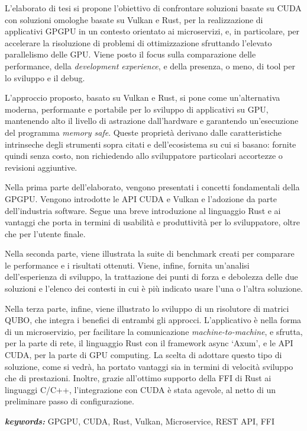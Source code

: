 
L'elaborato di tesi si propone l'obiettivo di confrontare soluzioni basate su \gls{CUDA} con soluzioni omologhe basate su Vulkan e Rust, per la realizzazione di applicativi \gls{GPGPU} in un contesto orientato ai microservizi, e, in particolare, per accelerare la risoluzione di problemi di ottimizzazione sfruttando l'elevato parallelismo delle GPU. Viene posto il focus sulla comparazione delle performance, della \textit{development experience}, e della presenza, o meno, di tool per lo sviluppo e il debug.

L'approccio proposto, basato su Vulkan e Rust, si pone come un'alternativa moderna, performante e portabile per lo sviluppo di applicativi su GPU, mantenendo alto il livello di astrazione dall'hardware e garantendo un'esecuzione del programma \textit{memory safe}. Queste proprietà derivano dalle caratteristiche intrinseche degli strumenti sopra citati e dell'ecosistema su cui si basano: fornite quindi senza costo, non richiedendo allo sviluppatore particolari accortezze o revisioni aggiuntive.

Nella prima parte dell'elaborato, vengono presentati i concetti fondamentali della \gls{GPGPU}. Vengono introdotte le \gls{API} \gls{CUDA} e Vulkan e l'adozione da parte dell'industria software. Segue una breve introduzione al linguaggio Rust e ai vantaggi che porta in termini di usabilità e produttività per lo sviluppatore, oltre che per l'utente finale.

Nella seconda parte, viene illustrata la suite di benchmark creati per comparare le performance e i risultati ottenuti. Viene, infine, fornita un'analisi dell'esperienza di sviluppo, la trattazione dei punti di forza e debolezza delle due soluzioni e l'elenco dei contesti in cui è più indicato usare l'una o l'altra soluzione.

Nella terza parte, infine, viene illustrato lo sviluppo di un risolutore di matrici QUBO, che integra i benefici di entrambi gli approcci. L'applicativo è nella forma di un microservizio, per facilitare la comunicazione \textit{machine-to-machine}, e sfrutta, per la parte di rete, il linguaggio Rust con il framework async `Axum', e le \gls{API} \gls{CUDA}, per la parte di \gls{GPU} computing. La scelta di adottare questo tipo di soluzione, come si vedrà, ha portato vantaggi sia in termini di velocità sviluppo che di prestazioni. Inoltre, grazie all'ottimo supporto della FFI di Rust ai linguaggi C/C++, l'integrazione con \gls{CUDA} è stata agevole, al netto di un preliminare passo di configurazione.

\bigskip

\textit{\textbf{keywords:}} GPGPU, CUDA, Rust, Vulkan, Microservice, REST API, FFI
